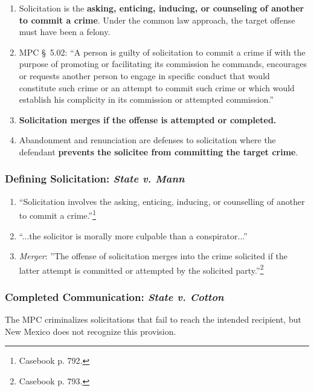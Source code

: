 \begin{enumerate}
    \item Solicitation is the \textbf{asking, enticing, inducing, or 
    counseling of another to commit a crime}. Under the common law approach, 
    the {target offense must have been a felony}.
    \item MPC \S\ 5.02: ``A person is guilty of solicitation to commit a crime 
    if with the purpose of promoting or facilitating its commission he 
    commands, encourages or requests another person to engage in specific 
    conduct that would constitute such crime or an attempt to commit such 
    crime or which would establish his complicity in its commission or 
    attempted commission.''
    \item \textbf{Solicitation merges if the offense is attempted or 
    completed.}
    \item Abandonment and renunciation are defenses to solicitation where the 
    defendant \textbf{prevents the solicitee from committing the target 
    crime}.
\end{enumerate}

\subsubsection{Defining Solicitation: \emph{State v. Mann}}

\begin{enumerate}
    \item ``Solicitation involves the asking, enticing, inducing, or 
    counselling of another to commit a crime.''\footnote{Casebook p. 792.}
    \item ``...the solicitor is morally more culpable than a conspirator...''
    \item \emph{Merger}: ''The offense of solicitation merges into the crime 
    solicited if the latter attempt is committed or attempted by the solicited 
    party.''\footnote{Casebook p. 793.}
\end{enumerate}

\subsubsection{Completed Communication: \emph{State v. Cotton}}

The MPC criminalizes solicitations that fail to reach the intended recipient, 
but New Mexico does not recognize this provision.

